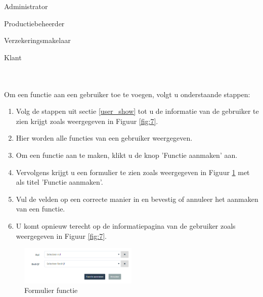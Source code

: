 \documentclass[11pt,openany]{article}
\newcommand{\cmark}{\ding{51}}%
\newcommand{\xmark}{\ding{55}}%
\newcommand{\done}{\rlap{$\square$}{\raisebox{2pt}{\large\hspace{1pt}\cmark}}%
	\hspace{-2.5pt}}
\newcommand{\wontfix}{\rlap{$\square$}{\large\hspace{1pt}\xmark}}
\begin{document}
\begin{todolist}
	\item[\done] Administrator
	\item[\done] Productiebeheerder
	\item[\done] Verzekeringsmakelaar
	\item[\wontfix] Klant 
\end{todolist}
\\
\\
Om een functie aan een gebruiker toe te voegen, volgt u onderstaande stappen:
\begin{enumerate}
	\item Volg de stappen uit sectie \ref{user_show} tot u de informatie van de gebruiker te zien krijgt zoals weergegeven in Figuur \ref{fig:7}.
	\item Hier worden alle functies van een gebruiker weergegeven.
	\item Om een functie aan te maken, klikt u de knop 'Functie aanmaken' aan.
	\item Vervolgens krijgt u een formulier te zien zoals weergegeven in Figuur \ref{fig:9} met als titel 'Functie aanmaken'.
	\item Vul de velden op een correcte manier in en bevestig of annuleer het aanmaken van een functie.
	\item U komt opnieuw terecht op de informatiepagina van de gebruiker zoals weergegeven in Figuur \ref{fig:7}.
\end{enumerate}

\begin{figure}
	\centering
	\includegraphics[width=0.5\textwidth]{img/fig9.png}
	\caption{Formulier functie} 
	\label{fig:9} 
\end{figure}
\end{document}
